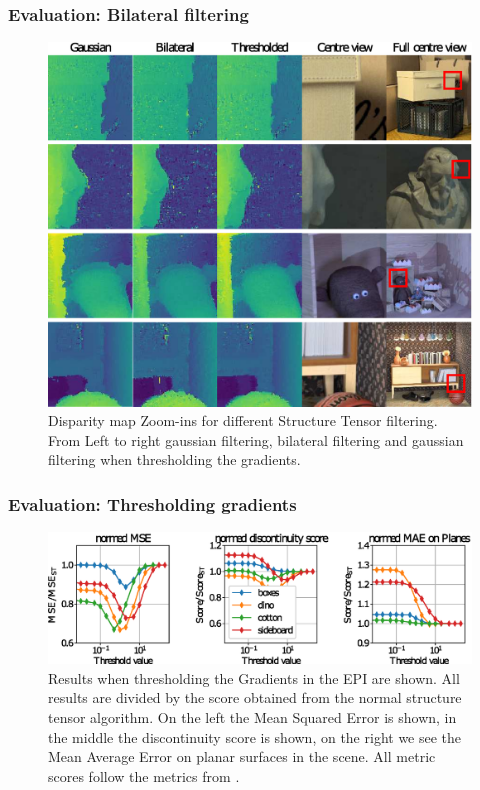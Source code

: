 \documentclass[11pt]{beamer}
\begin{document}
\begin{frame}
\frametitle{Evaluation: Bilateral filtering}
\begin{figure}
	\centering
	\includegraphics[width=0.9\linewidth]{images/thresh_results}
	\caption[Disparity map Zoom-ins for different methods]{Disparity map Zoom-ins for different Structure Tensor filtering. From Left to right gaussian filtering, bilateral filtering and gaussian filtering when thresholding the gradients.}
	\label{fig:threshresults}
\end{figure}
\end{frame}

\begin{frame}
\frametitle{Evaluation: Thresholding gradients}
\begin{figure}
	\centering
	\includegraphics[width=1\linewidth]{images/thresh_params}
	\caption[Results when thresholding the Gradients in the EPI]{Results when thresholding the Gradients in the EPI are shown. All results are divided by the score obtained from the normal structure tensor algorithm. On the left the Mean Squared Error is shown, in the middle the discontinuity score is shown, on the right we see the Mean Average Error on planar surfaces in the scene. All metric scores follow the metrics from \cite{honauer2016benchmark}. }
	\label{fig:threshparams}
\end{figure}
\end{frame}
\end{document}
